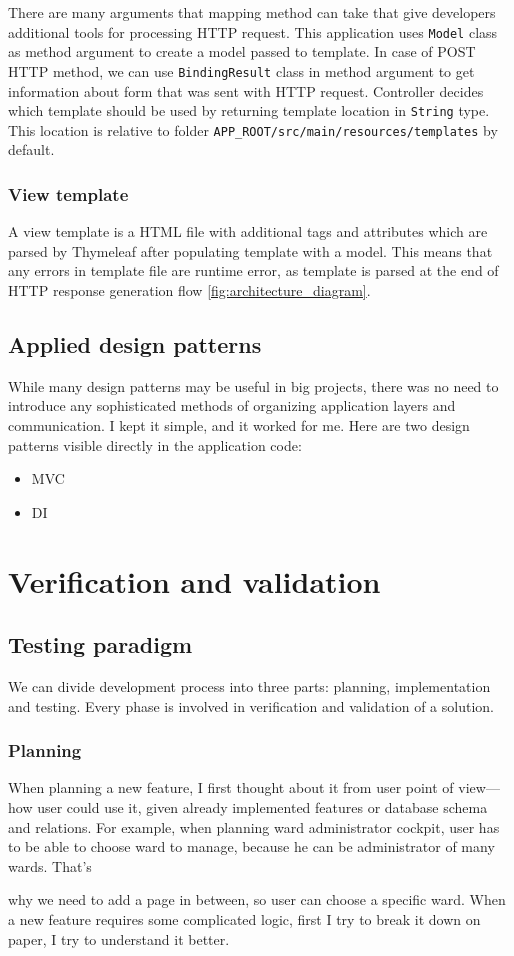 \documentclass[a4paper,twoside,12pt]{book}
\newcommand{\ksremark}[1]{%
{%
{\color{brickred}{[\foreignlanguage{polish}{#1}]}}}%
\addcontentsline{rks}{uwagas}{\protect{\foreignlanguage{polish}{#1}}}%
}
\begin{document}
      There are many arguments that mapping method can take that give developers additional tools for processing HTTP request.
      This application uses \lstinline|Model| class as method argument to create a model passed to template.
      In case of POST HTTP method, we can use \lstinline|BindingResult| class in method argument to get information about form that was sent with HTTP request.
      Controller decides which template should be used by returning template location in \lstinline|String| type.
      This location is relative to folder \lstinline[language=bash]|APP_ROOT/src/main/resources/templates| by default.

    \subsection{View template}
      A view template is a HTML file with additional tags and attributes which are parsed by Thymeleaf after populating template with a model.
      This means that any errors in template file are runtime error, as template is parsed at the end of HTTP response generation flow \ref{fig:architecture_diagram}.

  \section{Applied design patterns}
    While many design patterns may be useful in big projects, there was no need to introduce any sophisticated methods of organizing application layers and communication.
    I kept it simple, and it worked for me. Here are two design patterns visible directly in the application code:
    \begin{itemize}
      \item MVC
      \item DI
    \end{itemize}

\chapter{Verification and validation}
  \section{Testing paradigm}
    We can divide development process into three parts: planning, implementation and testing. Every phase is involved in verification and validation of a solution.
      \subsection{Planning}
        When planning a new feature, I first thought about it from user point of view---how user could use it, given already implemented features or database schema and relations.
        For example, when planning ward administrator cockpit, user has to be able to choose ward to manage, because he can be administrator of many wards.
        That's \ksremark{That is} why we need to add a page in between, so user can choose a specific ward.
        When a new feature requires some complicated logic, first I try to break it down on paper, I try to understand it better.
\end{document}
